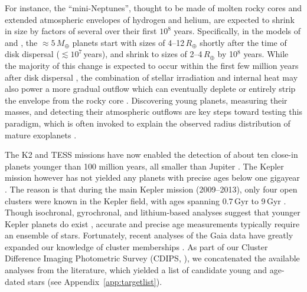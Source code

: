 \documentclass[12pt,modern,twocolumn,tighten]{aastex63}
\begin{document}
For instance, the ``mini-Neptunes'', thought to be made of molten
rocky cores \citep{kite_atmosphere_2020} and extended atmospheric
envelopes of hydrogen and helium, are expected to shrink in size by
factors of several over their first $10^8$ years.  Specifically, in
the models of \citet{owen_atmospheres_2016} and
\citet{owen_constraining_2020}, the $\approx5\,M_\oplus$ planets start
with sizes of 4--12\,$R_\oplus$ shortly after the time of disk
dispersal ($\lesssim$$10^7$\,years), and shrink to sizes of
2--4\,$R_\oplus$ by 10$^8$ years.  While the majority of this change
is expected to occur within the first few million years after disk
dispersal \citep{owen_atmospheres_2016}, the combination of stellar
irradiation and internal heat may also power a more gradual outflow
which can eventually deplete or entirely strip the envelope from the
rocky core \citep{Owen_Wu_2013,ginzburg_corepowered_2018}.
Discovering young planets, measuring their masses, and detecting their
atmospheric outflows are key steps toward testing this paradigm, which
is often invoked to explain the observed radius distribution of mature
exoplanets \citep{Fulton_et_al_2017}.

The K2 and TESS missions have now enabled the detection of about ten
close-in planets younger than 100 million years, all smaller than
Jupiter
\citep{Mann_K2_33b_2016,David_et_al_2017,david_four_2019,newton_tess_2019,bouma_cluster_2020,plavchan_planet_2020,rizzuto_tess_2020,martioli_aumicbc_2021}.
The Kepler mission however has not yielded any planets with precise
ages below one gigayear \citep{Meibom_et_al_2013}.  The reason is that
during the main Kepler mission (2009--2013), only four open clusters
were known in the Kepler field,
with ages spanning 0.7\,Gyr to 9\,Gyr
\citep{meibom_kepler_2011}.  Though isochronal, gyrochronal, and lithium-based
analyses suggest that younger Kepler planets do exist
\citep{berger_identifying_2018,david_sizes_2021}, accurate and precise
age measurements typically require an ensemble of stars.  Fortunately,
recent analyses of the Gaia
data have greatly expanded our knowledge of cluster memberships
\citep[{\it
e.g.},][]{cantatgaudin_gaia_2018,zari_3d_2018,kounkel_untangling_2019,Meingast2021,Kerr2021}.
As part of our Cluster Difference Imaging Photometric Survey (CDIPS,
\citealt{bouma_cdipsI_2019}), we concatenated the available analyses
from the literature, which yielded a list of candidate young and
age-dated stars (see Appendix~\ref{app:targetlist}).
\end{document}
